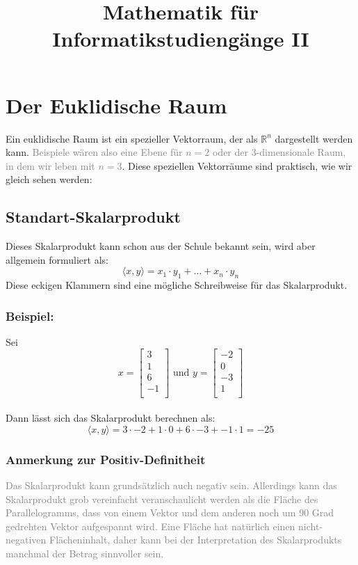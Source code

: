 \documentclass{article}
\title{Mathematik für Informatikstudiengänge II}
\date{}
\begin{document}
	\maketitle
	\tableofcontents
	\newpage
	\section{Der Euklidische Raum}
		Ein euklidische Raum ist ein spezieller Vektorraum, der als $\mathbb{R}^n$ dargestellt werden kann. \textcolor{gray}{Beispiele wären also eine Ebene für $n=2$ oder der 3-dimensionale Raum, in dem wir leben mit $n=3$}. Diese speziellen Vektorräume sind praktisch, wie wir gleich sehen werden:\\
		\subsection{Standart-Skalarprodukt}
			Dieses Skalarprodukt kann schon aus der Schule bekannt sein, wird aber allgemein formuliert als:
			\begin{equation}
				\langle x, y \rangle = x_1 \cdot y_1 + \dots + x_n \cdot y_n
			\end{equation}
			Diese eckigen Klammern sind eine mögliche Schreibweise für das Skalarprodukt.
		\subsubsection{Beispiel:}
			Sei \begin{equation*} x = \begin{bmatrix}
				3 \\ 1 \\ 6 \\ -1 \\
			\end{bmatrix} \mbox { und }y = \begin{bmatrix}
			-2 \\ 0 \\ -3 \\ 1 \\
			\end{bmatrix}\end{equation*} \\
			Dann lässt sich das Skalarprodukt berechnen als:\\
			\begin{equation*} \langle x, y \rangle = 3 \cdot -2 + 1 \cdot 0 + 6 \cdot -3 + -1 \cdot 1 =  -25 \end{equation*}
			\subsubsection{Anmerkung zur Positiv-Definitheit}
				\textcolor{gray}{Das Skalarprodukt kann grundsätzlich auch negativ sein. Allerdings kann das Skalarprodukt grob vereinfacht veranschaulicht werden als die Fläche des Parallelogramms, dass von einem Vektor und dem anderen noch um 90 Grad gedrehten Vektor aufgespannt wird. Eine Fläche hat natürlich einen nicht-negativen Flächeninhalt, daher kann bei der Interpretation des Skalarprodukts manchmal der Betrag sinnvoller sein.}
\end{document}
